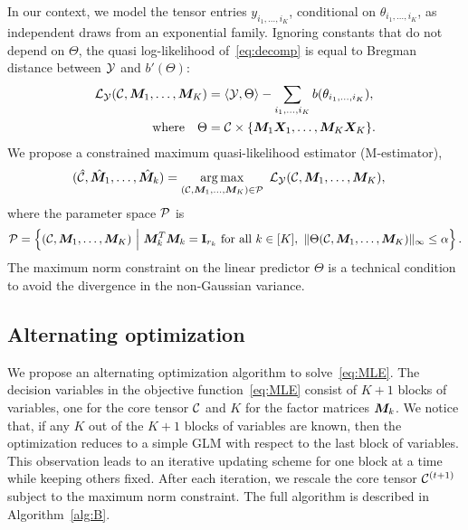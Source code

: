\documentclass[12pt]{article}
\theoremstyle{definition}
\theoremstyle{definition}
\begin{document}
In our context, we model the tensor entries $y_{i_1,\ldots,i_K}$, conditional on $\theta_{i_1,\ldots,i_K}$, as independent draws from an exponential family. Ignoring constants that do not depend on $\Theta$, the quasi log-likelihood of~\eqref{eq:decomp} is equal to Bregman distance between $\mathcal{Y}$ and $b'(\Theta)$:
\begin{align}\label{eq:loglikelihood}
\mathcal{L}_{\mathcal{Y}}(\mathcal{C},\bm M_1,\ldots,\bm M_K)&=\langle \mathcal{Y}, \Theta \rangle - \sum_{i_1,\ldots,i_K} b(\theta_{i_1,\ldots,i_K}),\\
 \text{where}\quad \Theta&=\mathcal{C}\times\{\bm M_1\bm X_1,\ldots,\bm M_K\bm X_K\}.
\end{align}
We propose a constrained maximum quasi-likelihood estimator (M-estimator),
\begin{align} \label{eq:MLE} 
(\hat \tC, \hat \mM_1,\ldots,\hat \mM_k) &=\argmax_{(\tC,\mM_1,\ldots,\mM_K)\in \tP} \ \tL_{\tY}(\tC,\mM_1,\ldots,\mM_K),
\end{align}
where the parameter space $\mathcal{P}$ is
\[
\tP=\left\{(\tC, \mM_1,\ldots,\mM_K) \ \Big| \ \mM_k^T\mM_k=\mathbf{I}_{r_k}\ \text{for all }k\in[K],\  \mnormSize{}{\Theta(\tC,\mM_1,\ldots,\mM_K)}\leq \alpha \right\}.
\]
The maximum norm constraint on the linear predictor $\Theta$ is a technical condition to avoid the divergence in the non-Gaussian variance.


\subsection{Alternating optimization} \label{subsec:alg}
We propose an alternating optimization algorithm to solve~\eqref{eq:MLE}. 
The decision variables in the objective function~\eqref{eq:MLE} consist of $K+1$ blocks of variables, one for the core tensor $\mathcal{C}$ and $K$ for the factor matrices $\bm M_k$. We notice that, if any $K$ out of the $K+1$ blocks of variables are known, then the optimization reduces to a simple GLM with respect to the last block of variables. This observation leads to an iterative updating scheme for one block at a time while keeping others fixed. After each iteration, we rescale the core tensor $\mathcal{C}^{(t+1)}$ subject to the maximum norm constraint. The full algorithm is described in Algorithm~\ref{alg:B}. 
\end{document}
